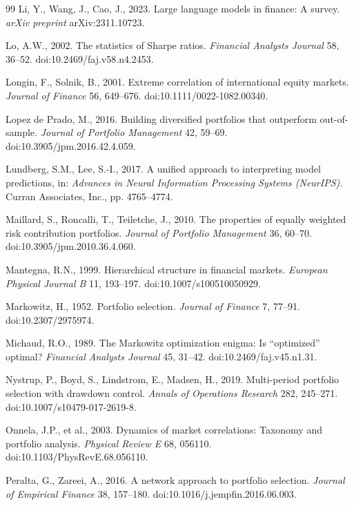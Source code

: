 \documentclass[11pt]{article}
\begin{document}
\begin{thebibliography}{99}
Li, Y., Wang, J., Cao, J., 2023. Large language models in finance: A survey. \textit{arXiv preprint} arXiv:2311.10723.

Lo, A.W., 2002. The statistics of Sharpe ratios. \textit{Financial Analysts Journal} 58, 36--52. doi:10.2469/faj.v58.n4.2453.

Longin, F., Solnik, B., 2001. Extreme correlation of international equity markets. \textit{Journal of Finance} 56, 649--676. doi:10.1111/0022-1082.00340.

Lopez de Prado, M., 2016. Building diversified portfolios that outperform out-of-sample. \textit{Journal of Portfolio Management} 42, 59--69. doi:10.3905/jpm.2016.42.4.059.

Lundberg, S.M., Lee, S.-I., 2017. A unified approach to interpreting model predictions, in: \textit{Advances in Neural Information Processing Systems (NeurIPS)}. Curran Associates, Inc., pp. 4765--4774.

Maillard, S., Roncalli, T., Teiletche, J., 2010. The properties of equally weighted risk contribution portfolios. \textit{Journal of Portfolio Management} 36, 60--70. doi:10.3905/jpm.2010.36.4.060.

Mantegna, R.N., 1999. Hierarchical structure in financial markets. \textit{European Physical Journal B} 11, 193--197. doi:10.1007/s100510050929.

Markowitz, H., 1952. Portfolio selection. \textit{Journal of Finance} 7, 77--91. doi:10.2307/2975974.

Michaud, R.O., 1989. The Markowitz optimization enigma: Is ``optimized'' optimal? \textit{Financial Analysts Journal} 45, 31--42. doi:10.2469/faj.v45.n1.31.

Nystrup, P., Boyd, S., Lindstrom, E., Madsen, H., 2019. Multi-period portfolio selection with drawdown control. \textit{Annals of Operations Research} 282, 245--271. doi:10.1007/s10479-017-2619-8.

Onnela, J.P., et al., 2003. Dynamics of market correlations: Taxonomy and portfolio analysis. \textit{Physical Review E} 68, 056110. doi:10.1103/PhysRevE.68.056110.

Peralta, G., Zareei, A., 2016. A network approach to portfolio selection. \textit{Journal of Empirical Finance} 38, 157--180. doi:10.1016/j.jempfin.2016.06.003.


\end{thebibliography}
\end{document}
